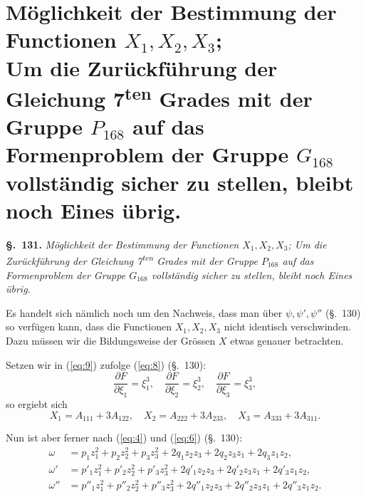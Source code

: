 \documentclass[12pt,a4paper]{article}
\theoremstyle{definition}
\begin{document}
\newpage
\section[Möglichkeit der Bestimmung der Functionen $X_1,X_2,X_3$]%
        {Möglichkeit der Bestimmung der Functionen $X_1,X_2,X_3$;\\
         Um die Zurückführung der Gleichung 7\textsuperscript{ten} Grades mit der Gruppe $P_{168}$ auf das Formenproblem der Gruppe $G_{168}$ vollständig sicher zu stellen, bleibt noch Eines übrig.}\label{sec:131}

\noindent\textbf{\S.~131.}\quad
\textit{Möglichkeit der Bestimmung der Functionen $X_1,X_2,X_3$; Um die Zurückführung der Gleichung 7\textsuperscript{ten} Grades mit der Gruppe $P_{168}$ auf das Formenproblem der Gruppe $G_{168}$ vollständig sicher zu stellen, bleibt noch Eines übrig.}\par\medskip

Es handelt sich nämlich noch um den Nachweis, dass man über $\psi,\psi',\psi''$ (\S.~130) so verfügen kann, dass die Functionen $X_1,X_2,X_3$ nicht identisch verschwinden. Dazu müssen wir die Bildungsweise der Grössen $X$ etwas genauer betrachten.

Setzen wir in (\ref{eq:9}) zufolge (\ref{eq:8}) (\S.~130):
\[
\frac{\partial F}{\partial\xi_1} = \xi_1^3,\quad
\frac{\partial F}{\partial\xi_2} = \xi_2^3,\quad
\frac{\partial F}{\partial\xi_3} = \xi_3^3,
\]
so ergiebt sich
\begin{equation}\label{eq:x1}
X_1 = A_{111} + 3A_{122},\quad
X_2 = A_{222} + 3A_{233},\quad
X_3 = A_{333} + 3A_{311}.
\end{equation}

Nun ist aber ferner nach (\ref{eq:4}) und (\ref{eq:6}) (\S.~130):
\begin{equation}\label{eq:2b}
\begin{aligned}
\omega &= p_1z_1^2 + p_2z_2^2 + p_3z_3^2 + 2q_1z_2z_3 + 2q_2z_3z_1 + 2q_3z_1z_2,\\
\omega' &= p'_1z_1^2 + p'_2z_2^2 + p'_3z_3^2 + 2q'_1z_2z_3 + 2q'_2z_3z_1 + 2q'_3z_1z_2,\\
\omega'' &= p''_1z_1^2 + p''_2z_2^2 + p''_3z_3^2 + 2q''_1z_2z_3 + 2q''_2z_3z_1 + 2q''_3z_1z_2.
\end{aligned}
\end{equation}
\end{document}
